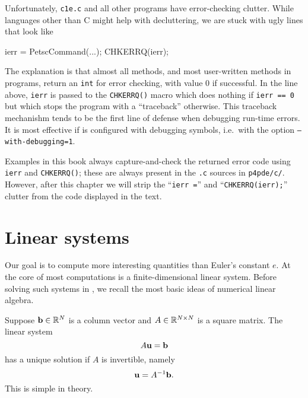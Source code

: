 Unfortunately, \texttt{c1e.c} and all other \PETSc programs have error-checking clutter.  While languages other than C might help with decluttering, we are stuck with ugly lines that look like
\begin{code}
ierr = PetscCommand(...); CHKERRQ(ierr);
\end{code}
The explanation is that almost all \PETSc methods, and most user-written methods in \PETSc programs, return an \texttt{int} for error checking, with value $0$ if successful.  In the line above, \texttt{ierr} is passed to the \texttt{CHKERRQ()} macro which does nothing if \texttt{ierr == 0} but which stops the program with a ``traceback'' otherwise.  This traceback mechanishm tends to be the first line of defense when debugging run-time errors.  It is most effective if \PETSc is configured with debugging symbols, i.e.~with the option \texttt{--with-debugging=1}.

Examples in this book always capture-and-check the returned error code using \texttt{ierr} and \texttt{CHKERRQ()}; these are always present in the \texttt{.c} sources in \texttt{p4pde/c/}.  However, after this chapter we will strip the ``\texttt{ierr =}'' and ``\texttt{CHKERRQ(ierr);}'' clutter from the code displayed in the text.


\section{Linear systems}

Our goal is to compute more interesting quantities than Euler's constant $e$.  At the core of most \PETSc computations is a finite-dimensional linear system.  Before solving such systems in \PETSc, we recall the most basic ideas of numerical linear algebra.

Suppose $\mathbf{b}\in \mathbb{R}^{N}$ is a column vector and $A\in\mathbb{R}^{N\times N}$ is a square matrix.  The linear system
\begin{equation}
A \mathbf{u} = \mathbf{b} \label{introsystem}
\end{equation}
has a unique solution if $A$ is invertible, namely
\begin{equation}
\mathbf{u} = A^{-1} \mathbf{b}. \label{introsolution}
\end{equation}
This is simple in theory.


